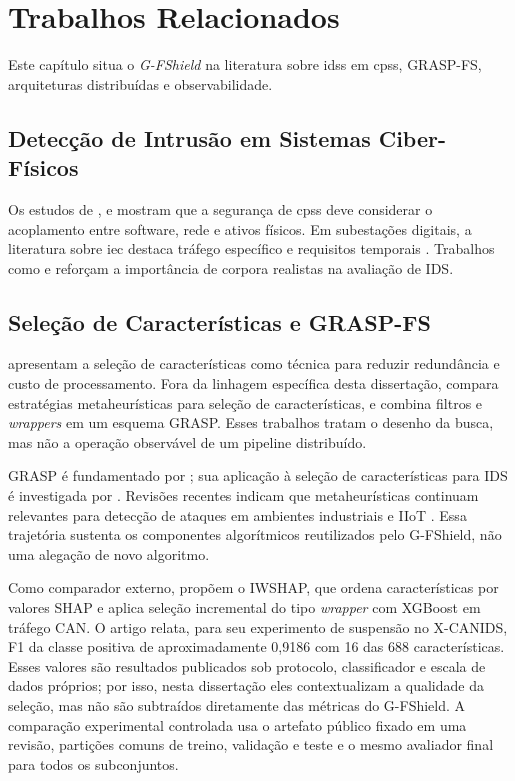 \chapter{Trabalhos Relacionados}
\label{chapter:relacionados}

Este capítulo situa o \textit{G-FShield} na literatura sobre \acp{ids} em \acp{cps}, GRASP-FS, arquiteturas distribuídas e observabilidade.

\section{Detecção de Intrusão em Sistemas Ciber-Físicos}

Os estudos de ,  e  mostram que a segurança de \acp{cps} deve considerar o acoplamento entre software, rede e ativos físicos. Em subestações digitais, a literatura sobre \ac{iec} destaca tráfego específico e requisitos temporais \cite{iec61850,mackiewicz2006overview,aftab2020iec}. Trabalhos como  e  reforçam a importância de corpora realistas na avaliação de IDS.

\section{Seleção de Características e GRASP-FS}

 apresentam a seleção de características como técnica para reduzir redundância e custo de processamento. Fora da linhagem específica desta dissertação,  compara estratégias metaheurísticas para seleção de características, e  combina filtros e \textit{wrappers} em um esquema GRASP. Esses trabalhos tratam o desenho da busca, mas não a operação observável de um pipeline distribuído.

GRASP é fundamentado por ; sua aplicação à seleção de características para IDS é investigada por . Revisões recentes indicam que metaheurísticas continuam relevantes para detecção de ataques em ambientes industriais e IIoT \cite{Termanini2025Survey,Francis2026MFSReview}. Essa trajetória sustenta os componentes algorítmicos reutilizados pelo G-FShield, não uma alegação de novo algoritmo.

Como comparador externo,  propõem o IWSHAP, que ordena características por valores SHAP e aplica seleção incremental do tipo \textit{wrapper} com XGBoost em tráfego CAN. O artigo relata, para seu experimento de suspensão no X-CANIDS, F1 da classe positiva de aproximadamente 0,9186 com 16 das 688 características. Esses valores são resultados publicados sob protocolo, classificador e escala de dados próprios; por isso, nesta dissertação eles contextualizam a qualidade da seleção, mas não são subtraídos diretamente das métricas do G-FShield. A comparação experimental controlada usa o artefato público fixado em uma revisão, partições comuns de treino, validação e teste e o mesmo avaliador final para todos os subconjuntos.

